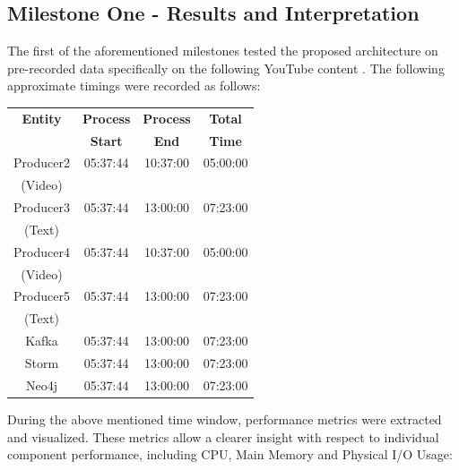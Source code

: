 \documentclass[10pt,conference]{IEEEtran}
\begin{document}
\subsection{Milestone One - Results and Interpretation}
The first of the aforementioned milestones tested the proposed architecture on pre-recorded data specifically on the following YouTube content \cite{YouTubeLastWeekTonightChannel}. The following approximate timings were recorded as follows:

\begin{table}[h]
    \centering
    \begin{tabular}{|c|c|c|c|}
        \hline
        \textbf{Entity}&\textbf{Process}&\textbf{Process}&\textbf{Total}    \\
        &\textbf{Start}&\textbf{End}&\textbf{Time}                          \\ \hline
        Producer2&05:37:44&10:37:00&05:00:00                                \\
        (Video)&&&                                                          \\ \hline
        Producer3&05:37:44&13:00:00&07:23:00                                \\
        (Text)&&&                                                           \\ \hline
        Producer4&05:37:44&10:37:00&05:00:00                                \\
        (Video)&&&                                                          \\ \hline
        Producer5&05:37:44&13:00:00&07:23:00                                \\
        (Text)&&&                                                           \\ \hline
        Kafka&05:37:44&13:00:00&07:23:00                                    \\ \hline
        Storm&05:37:44&13:00:00&07:23:00                                    \\ \hline
        Neo4j&05:37:44&13:00:00&07:23:00                                    \\ \hline
    \end{tabular}
    \label{tab:Milestone1Timings}
\end{table}

During the above mentioned time window, performance metrics were extracted and visualized. These metrics allow a clearer insight with respect to individual component performance, including CPU, Main Memory and Physical I/O Usage:
\end{document}

